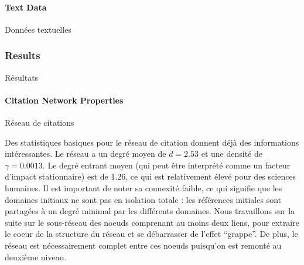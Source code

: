 \paragraph{Text Data}{Données textuelles}




\subsubsection{Results}{Résultats}


\paragraph{Citation Network Properties}{Réseau de citations}


Des statistiques basiques pour le réseau de citation donnent déjà des informations intéressantes. Le réseau a un degré moyen de $\bar{d}=2.53$ et une densité de $\gamma=0.0013$. Le degré entrant moyen (qui peut être interprété comme un facteur d'impact stationnaire) est de 1.26, ce qui est relativement élevé pour des sciences humaines. Il est important de noter sa connexité faible, ce qui signifie que les domaines initiaux ne sont pas en isolation totale : les références initiales sont partagées à un degré minimal par les différents domaines. Nous travaillons sur la suite sur le sous-réseau des noeuds comprenant au moins deux liens, pour extraire le coeur de la structure du réseau et se débarrasser de l'effet ``grappe''. De plus, le réseau est nécessairement complet entre ces noeuds puisqu'on est remonté au deuxième niveau.


